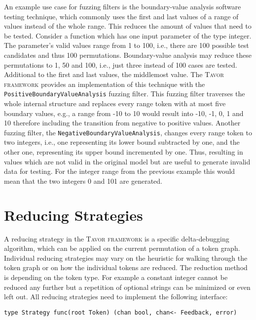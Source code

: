 An example use case for fuzzing filters is the boundary-value analysis software testing technique, which commonly uses the first and last values of a range of values instead of the whole range. This reduces the amount of values that need to be tested. Consider a function which has one input parameter of the type integer. The parameter's valid values range from 1 to 100, i.e., there are 100 possible test candidates and thus 100 permutations. Boundary-value analysis may reduce these permutations to 1, 50 and 100, i.e., just three instead of 100 cases are tested. Additional to the first and last values, the middlemost value. The \textsc{Tavor framework} provides an implementation of this technique with the \texttt{PositiveBoundaryValueAnalysis} fuzzing filter. This fuzzing filter traverses the whole internal structure and replaces every range token with at most five boundary values, e.g., a range from -10 to 10 would result into -10, -1, 0, 1 and 10 therefore including the transition from negative to positive values. Another fuzzing filter, the \texttt{NegativeBoundaryValueAnalysis}, changes every range token to two integers, i.e., one representing its lower bound subtracted by one, and the other one, representing its upper bound incremented by one. Thus, resulting in values which are not valid in the original model but are useful to generate invalid data for testing. For the integer range from the previous example this would mean that the two integers 0 and 101 are generated.

\section{Reducing Strategies}
\label{sec:reducingStrategies}

A reducing strategy in the \textsc{Tavor framework} is a specific delta-debugging algorithm, which can be applied on the current permutation of a token graph. Individual reducing strategies may vary on the heuristic for walking through the token graph or on how the individual tokens are reduced. The reduction method is depending on the token type. For example a constant integer cannot be reduced any further but a repetition of optional strings can be minimized or even left out. All reducing strategies need to implement the following interface:

\begin{center} \texttt{type Strategy func(root Token) (chan bool, chan<- Feedback, error)} \end{center}


